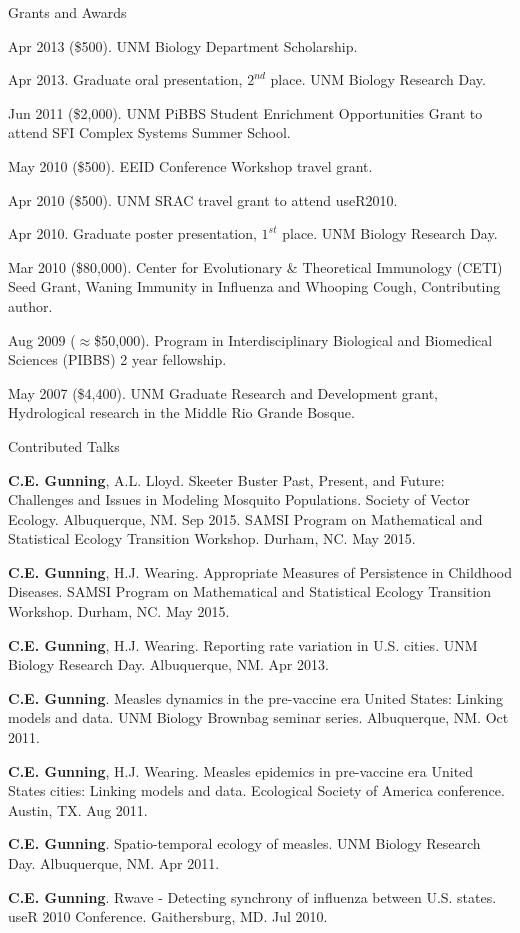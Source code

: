 \documentclass{resume} %
\begin{document}
\begin{rSection}{Grants and Awards}
\item Apr 2013 (\$500). UNM Biology Department Scholarship.
\item Apr 2013. Graduate oral presentation, $2^{nd}$ place. UNM Biology Research Day.
\item Jun 2011 (\$2,000). UNM PiBBS Student Enrichment Opportunities Grant to
attend SFI Complex Systems Summer School.
\item May 2010 (\$500). EEID Conference Workshop travel grant.
\item Apr 2010 (\$500). UNM SRAC travel grant to attend useR2010.
\item Apr 2010.  Graduate poster presentation, $1^{st}$ place. UNM Biology Research Day.
\item Mar 2010 (\$80,000). Center for Evolutionary \& Theoretical Immunology (CETI) Seed
Grant, Waning Immunity in Influenza and Whooping Cough,
Contributing author.
\item Aug 2009 ($\approx$\$50,000). Program in Interdisciplinary Biological and Biomedical
Sciences (PIBBS) 2 year fellowship.
\item May 2007 (\$4,400). UNM Graduate Research and Development grant, Hydrological
research in the Middle Rio Grande Bosque. 
\end{rSection}

\begin{rSection}{Contributed Talks}
\item {\bf C.E. Gunning}, A.L. Lloyd.  Skeeter Buster Past, Present, and Future: Challenges and Issues in Modeling Mosquito Populations.
Society of Vector Ecology. Albuquerque, NM. Sep 2015.
SAMSI Program on Mathematical and Statistical Ecology Transition Workshop. Durham, NC. May 2015.
\item {\bf C.E. Gunning}, H.J. Wearing.  Appropriate Measures of Persistence in Childhood Diseases.
SAMSI Program on Mathematical and Statistical Ecology Transition Workshop. Durham, NC. May 2015.
\item {\bf C.E. Gunning}, H.J. Wearing.  Reporting rate variation in U.S. cities.
UNM Biology Research Day. Albuquerque, NM. Apr 2013.
\item {\bf C.E. Gunning}.  Measles dynamics in the pre-vaccine era United States: Linking
models and data. UNM Biology Brownbag seminar series. Albuquerque, NM. Oct 2011.
\item {\bf C.E. Gunning}, H.J. Wearing.  Measles epidemics in pre-vaccine era United States cities: Linking models and data. Ecological Society of America conference. Austin, TX. Aug 2011.
\item {\bf C.E. Gunning}.  Spatio-temporal ecology of measles. 
UNM Biology Research Day. Albuquerque, NM. Apr 2011.
\item {\bf C.E. Gunning}. Rwave - Detecting synchrony of influenza between U.S. states.
useR 2010 Conference. Gaithersburg, MD. Jul 2010.
\end{rSection}
\end{document}
